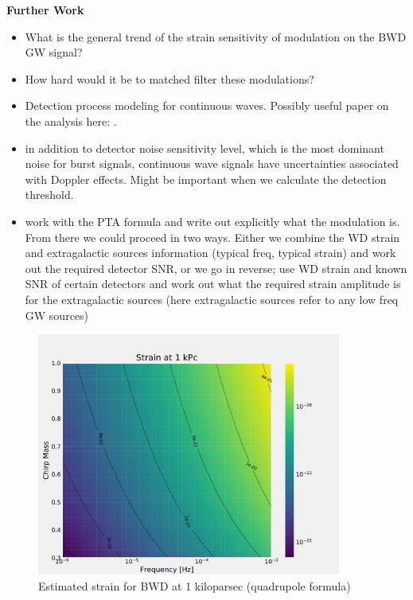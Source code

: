\documentclass{article}
\begin{document}
\textbf{Further Work}
\begin{itemize}
    \item What is the general trend of the strain sensitivity of modulation on the BWD GW signal?
    \item How hard would it be to matched filter these modulations?
    \item Detection process modeling for continuous waves. Possibly useful paper on the analysis here: \cite{Schutz1997}.
    \item in addition to detector noise sensitivity level, which is the most dominant noise for burst signals, continuous wave signals have uncertainties associated with Doppler effects. Might be important when we calculate the detection threshold.
    \item work with the PTA formula and write out explicitly what the modulation is. From there we could proceed in two ways. Either we combine the WD strain and extragalactic sources information (typical freq, typical strain) and work out the required detector SNR, or we go in reverse; use WD strain and known SNR of certain detectors and work out what the required strain amplitude is for the extragalactic sources (here extragalactic sources refer to any low freq GW sources)

\end{itemize}

\begin{figure}[H]
    \centering
    \includegraphics[width=10cm]{Strain1kpc.pdf}
    \caption{Estimated strain for BWD at 1 kiloparsec (quadrupole formula)}
    \label{fig:h1kpc}
\end{figure}
\end{document}
